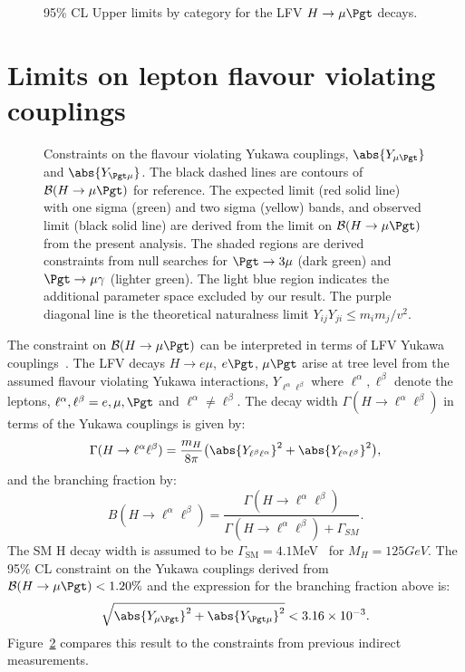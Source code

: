 \begin{figure}[hbtp]\centering
 \caption{95\% CL Upper limits by category for the LFV $H \rightarrow \mu \Pgt$  decays.}
 \label{fig:limits_summary}\end{figure}

\section{Limits on lepton flavour violating couplings}
\begin{figure}[hbt]\centering
 \caption{Constraints on the flavour violating Yukawa couplings, $\abs{Y_{\mu\Pgt}}$ and $\abs{Y_{\Pgt\mu}}$.
The black dashed lines are contours of $\mathcal{B}(H \rightarrow \mu \Pgt )$ for reference.
The expected limit (red solid line) with one sigma (green)  and two sigma (yellow) bands, and observed limit (black solid line) are derived from the limit on $\mathcal{B}(H \rightarrow \mu \Pgt )$ from the present analysis.  The shaded regions are derived constraints from null searches for $\Pgt \rightarrow 3\mu$ (dark green) and $\Pgt \rightarrow \mu \gamma$ (lighter green).
The light blue region indicates the additional parameter space excluded by our result.
The purple diagonal line is the theoretical naturalness
limit $Y_{ij}Y_{ji} \leq m_im_j/v^2$. }
 \label{fig:yukawalimits}\end{figure}



The constraint on $\mathcal{B}(H \rightarrow \mu \Pgt )$ can be interpreted in terms of LFV  Yukawa couplings~\cite{Harnik:2012pb}.
The LFV decays $H \rightarrow e\mu$, $e\Pgt$, $\mu\Pgt$ arise at tree level from the assumed
flavour violating Yukawa interactions, $Y_{\ell^{\alpha}\ell^{\beta}}$ where $\ell^{\alpha},\ell^{\beta}$ denote the leptons, $\ell^{\alpha},\ell^{\beta}=e,\mu,\Pgt$ and $\ell^{\alpha}\neq \ell^{\beta}$.
The decay width $\Gamma(H \rightarrow \ell^{\alpha}\ell^{\beta})$  in terms of the Yukawa couplings is given by:
\begin{equation*}
\Gamma(H \rightarrow \ell^{\alpha}\ell^{\beta})=\frac{m_{H}}{8\pi}\bigl(\abs{Y_{\ell^{\beta}\ell^{\alpha}}}^2 + \abs{Y_{\ell^{\alpha}\ell^{\beta}}}^2\bigr),
\end{equation*}
and the branching fraction by:
\begin{equation*}
B(H \rightarrow \ell^{\alpha}\ell^{\beta})=\frac{\Gamma(H\rightarrow \ell^{\alpha}\ell^{\beta})}{\Gamma(H\rightarrow \ell^{\alpha}\ell^{\beta}) + \Gamma_{SM}}.
\end{equation*}
The SM H decay width is assumed to be $\Gamma_{\mathrm{SM}}=4.1$MeV~\cite{Denner:2011mq} for $M_{H}=125GeV$.
The 95\% CL constraint on the Yukawa couplings derived from $\mathcal{B}(H \rightarrow \mu \Pgt )<1.20\%$ and the expression for the branching fraction above is:\begin{equation*}
\sqrt{\abs{Y_{\mu\Pgt}}^{2}+\abs{Y_{\Pgt\mu}}^{2}}<3.16\times 10^{-3}.
\end{equation*}
Figure~\ref{fig:yukawalimits} compares this result to the constraints from previous indirect
measurements.

